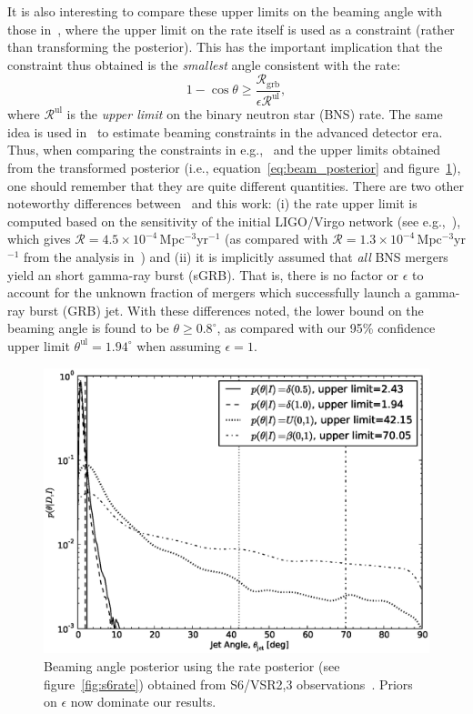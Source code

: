 \documentclass[twocolumn,nofootinbib]{revtex4-1}
\newcommand{\grbrate}{{{\mathcal R}_{\mathrm{grb}}}}
\newcommand{\cbcrate}{{{\mathcal R}}}
\def\bns#1{binary neutron star#1 (BNS#1)\gdef\bns{BNS}}
\def\grb#1{gamma-ray burst#1 (GRB#1)\gdef\grb{GRB}}
\def\sgrb#1{short gamma-ray burst#1 (sGRB#1)\gdef\sgrb{sGRB}}
\begin{document}
It is also interesting to compare these upper limits on the beaming angle with
those in~\cite{2013PhRvL.111r1101C}, where the upper limit on the rate itself is
used as a constraint (rather than transforming the posterior).  This has the
important implication that the constraint thus obtained is the \emph{smallest}
angle consistent with the rate:
%
\begin{equation}
    1 - \cos \theta \geq \frac{\grbrate}{\epsilon \cbcrate^{\mathrm{ul}}},
\end{equation}
%
where $\cbcrate^{\mathrm{ul}}$ is the \emph{upper limit} on the \bns{} rate.
The same idea is used in~\cite{0004-637X-809-1-53} to estimate beaming
constraints in the advanced detector era.  Thus, when comparing the constraints
in e.g.,~\cite{2013PhRvL.111r1101C} and the upper limits obtained from the
transformed posterior (i.e., equation~\ref{eq:beam_posterior} and
figure~\ref{fig:s6angle}), one should remember that they are quite different
quantities.  There are two other noteworthy differences
between~\cite{2013PhRvL.111r1101C} and this work: (i) the rate upper limit is
computed based on the sensitivity of the initial LIGO/Virgo network (see
e.g.,~\cite{BradyFairhurst08}), which gives $\cbcrate=4.5\times
10^{-4}$\,Mpc$^{-3}$yr$^{-1}$ (as compared with $\cbcrate=1.3 \times
10^{-4}$\,Mpc$^{-3}$yr$^{-1}$ from the analysis in~\cite{S6lowmass}) and (ii) it
is implicitly assumed that \emph{all} \bns{} mergers yield an \sgrb{}.  That is,
there is no factor or $\epsilon$ to account for the unknown fraction of mergers
which successfully launch a \grb{} jet.  With these differences noted, the lower
bound on the beaming angle is found to be $\theta \geq 0.8^{\circ}$, as compared
with our 95\% confidence upper limit $\theta^{\mathrm{ul}}=1.94^{\circ}$ when
assuming $\epsilon=1$.  

\begin{figure}
\centering
\includegraphics[width=\linewidth]{jet_angle_posterior_iligo.eps}
\caption{Beaming angle posterior using the rate posterior (see
figure~\ref{fig:s6rate}) obtained from S6/VSR2,3 observations~\cite{S6lowmass}.
Priors on $\epsilon$ now dominate our results.\label{fig:s6angle}}
\end{figure}
\end{document}
